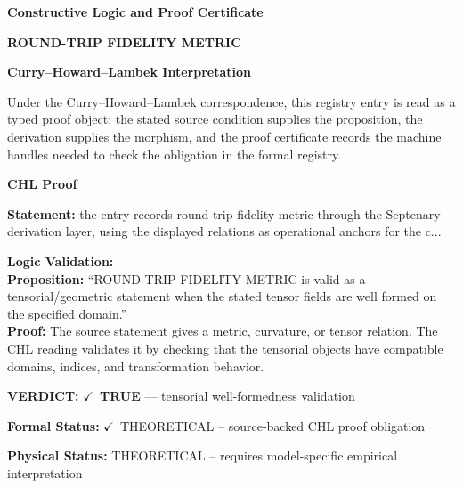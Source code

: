 \clearpage
\begingroup\tzpsupportsetup
\noindent\textbf{\fontsize{10.8pt}{12.8pt}\selectfont [ID 0672] Constructive Logic and Proof Certificate}\par
\noindent\textbf{\fontsize{10pt}{12pt}\selectfont ROUND-TRIP FIDELITY METRIC}\par
\vspace{0.45em}
\begingroup
\footnotesize
\setlength{\parskip}{0.22em}
\setlength{\parindent}{0pt}
\noindent\textbf{Curry--Howard--Lambek Interpretation}\par
Under the Curry--Howard--Lambek correspondence, this registry entry is read as a typed proof
object: the stated source condition supplies the proposition, the derivation supplies the
morphism, and the proof certificate records the machine handles needed to check the obligation
in the formal registry.

\vspace{0.45em}
\noindent\textbf{CHL Proof}\par
\textbf{Statement:} the entry records round-trip fidelity metric through the Septenary derivation layer,
using the displayed relations as operational anchors for the c...

\textbf{Logic Validation:}\\
\textbf{Proposition:} ``ROUND-TRIP FIDELITY METRIC is valid as a tensorial/geometric statement when the stated
tensor fields are well formed on the specified domain.''\\
\textbf{Proof:} The source statement gives a metric, curvature, or tensor relation. The CHL reading
validates it by checking that the tensorial objects have compatible domains, indices,
and transformation behavior.

\textbf{VERDICT:} \ensuremath{\checkmark}\ \textbf{TRUE} --- tensorial well-formedness validation

\textbf{Formal Status:} \ensuremath{\checkmark}\ THEORETICAL -- source-backed CHL proof obligation

\textbf{Physical Status:} THEORETICAL -- requires model-specific empirical interpretation
\par\vspace{0.45em}
\par
\ifTZPDarkEdition
{}
\fi
\endgroup
\endgroup
